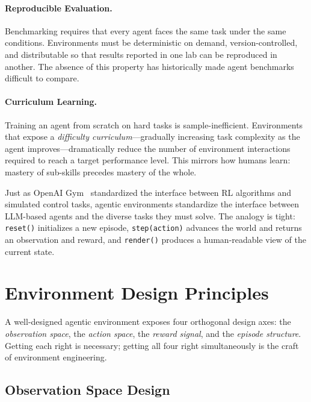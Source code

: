 \paragraph{Reproducible Evaluation.}
\label{reproducible-evaluation.}

Benchmarking requires that every agent faces the same task under the same conditions. Environments must be deterministic on demand, version-controlled, and distributable so that results reported in one lab can be reproduced in another. The absence of this property has historically made agent benchmarks difficult to compare.

\paragraph{Curriculum Learning.}
\label{curriculum-learning.}

Training an agent from scratch on hard tasks is sample-inefficient. Environments that expose a \emph{difficulty curriculum}---gradually increasing task complexity as the agent improves---dramatically reduce the number of environment interactions required to reach a target performance level. This mirrors how humans learn: mastery of sub-skills precedes mastery of the whole.

\begin{intuitionbox}
Just as OpenAI Gym~\cite{brockman2016openai} standardized the interface between RL algorithms and simulated control tasks, agentic environments standardize the interface between LLM-based agents and the diverse tasks they must solve. The analogy is tight: \texttt{reset()} initializes a new episode, \texttt{step(action)} advances the world and returns an observation and reward, and \texttt{render()} produces a human-readable view of the current state.
\end{intuitionbox}

\section{Environment Design Principles}
\label{sec:env-design}

A well-designed agentic environment exposes four orthogonal design axes: the \emph{observation space}, the \emph{action space}, the \emph{reward signal}, and the \emph{episode structure}. Getting each right is necessary; getting all four right simultaneously is the craft of environment engineering.

\subsection{Observation Space Design}
\label{observation-space-design}

